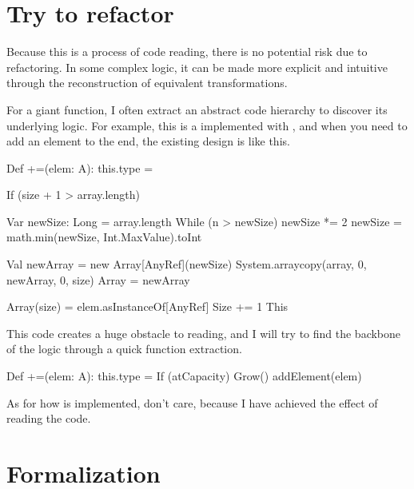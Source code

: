 \section{Try to refactor}

\begin{content}

Because this is a process of code reading, there is no potential risk due to refactoring. In some complex logic, it can be made more explicit and intuitive through the reconstruction of equivalent transformations.

For a giant function, I often extract an abstract code hierarchy to discover its underlying logic. For example, this is a  implemented with , and when you need to add an element to the end, the existing design is like this.

\begin{leftbar}
\begin{python}
Def +=(elem: A): this.type = {
  If (size + 1 > array.length) {
    Var newSize: Long = array.length
    While (n > newSize)
      newSize *= 2
    newSize = math.min(newSize, Int.MaxValue).toInt
  
    Val newArray = new Array[AnyRef](newSize)
    System.arraycopy(array, 0, newArray, 0, size)
    Array = newArray
  }
  Array(size) = elem.asInstanceOf[AnyRef]
  Size += 1
  This
}
\end{python}
\end{leftbar}

This code creates a huge obstacle to reading, and I will try to find the backbone of the logic through a quick function extraction.

\begin{leftbar}
\begin{python}
Def +=(elem: A): this.type = {
  If (atCapacity)
    Grow()
  addElement(elem)
}
\end{python}
\end{leftbar}

As for how  is implemented, don't care, because I have achieved the effect of reading the code.

\end{content}

\section{Formalization}

